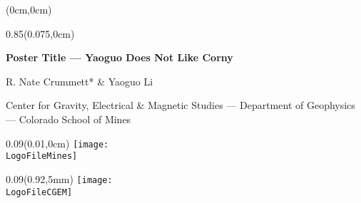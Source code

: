 \documentclass[dark]{cgem-poster}
\newcommand{\PosterTitle}{Poster Title --- Yaoguo Does Not Like Corny}
\newcommand{\PosterFirstAuthor}{R. Nate Crummett}
\newcommand{\PosterSecondAuthor}{Yaoguo Li}
\newcommand{\PosterAffiliationCGEM}{Center for Gravity, Electrical \& Magnetic Studies}
\newcommand{\PosterAffiliationMines}{Colorado School of Mines}
\newcommand{\PosterAffiliationGeophysics}{Department of Geophysics}
\begin{document}

  \newcommand{\titleheight}{0.09\pageheight}
  \newcommand{\PosterCGEMLogoHeight}{\dimexpr(\titleheight - 12mm)\relax}
  
  \begin{textblock*}{\pagewidth}(0cm,0cm)
    \begin{minipage}[t][\titleheight{}][t]{\pagewidth}
    \end{minipage}
  \end{textblock*}
  
  \begin{textblock*}{0.85\pagewidth}(0.075\pagewidth,0cm)
    \begin{center}
      \vspace{5mm}
      \Large
      \textbf{
        \PosterTitle{}
      }
      \par
      \vspace{5mm}
      \normalsize
      { \color{PosterSubtitleColor}
        \PosterFirstAuthor{}* \& \PosterSecondAuthor{}
        \par
        \small
        \PosterAffiliationCGEM{} --- %
          \PosterAffiliationGeophysics{} --- %
          \PosterAffiliationMines{}
      }
    \end{center}
  \end{textblock*}
  
  \begin{textblock*}{\titleheight{}}(0.01\pagewidth,0cm)
    \centering
    \texttt{[image: \\LogoFileMines]}
  \end{textblock*}
  
  \begin{textblock*}{\titleheight{}}(0.92\pagewidth,5mm)
    \centering
    \texttt{[image: \\LogoFileCGEM]}
  \end{textblock*}
  

  \newlength{\PosterOuterMarginSize}
  \setlength{\PosterOuterMarginSize}{1cm}
\end{document}
